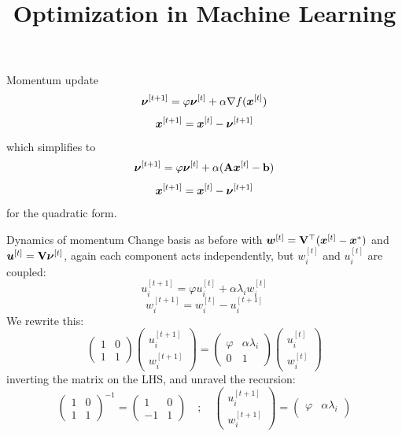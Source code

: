 \documentclass[11pt,compress,t,notes=noshow, xcolor=table]{beamer}
\title{Optimization in Machine Learning}
\begin{document}

\begin{framev}{Momentum update}
$$
\bm{\nu}^{[ t+1 ] } = \varphi \bm{\nu}^{[ t ] } + \alpha \nabla f(\bm{x}^{[ t ] })
$$
$$
\bm{x}^{[ t+1 ] } = \bm{x}^{[ t ] } - \bm{\nu}^{[ t+1 ] }
$$
which simplifies to
$$
\bm{\nu}^{[ t+1 ] } = \varphi \bm{\nu}^{[ t ] } + \alpha (\mathbf{A} \bm{x}^{[ t ] } - \mathbf{b})
$$
$$
\bm{x}^{[ t+1 ] } = \bm{x}^{[ t ] } - \bm{\nu}^{[ t+1 ] }
$$
for the quadratic form.
\end{framev}


\begin{framev}[fs=footnotesize]{Dynamics of momentum}
Change basis as before with $\wv^{[ t ] } = \V^\top (\xv^{[ t ] } - \xvs)$ and $\uv^{[ t ] } = \V \nuv^{[ t ] }$, again each component acts independently, but $w_i^{[ t ] }$ and $u_i^{[ t ] }$ are coupled:
$$
u_i^{[ t+1 ] } = \varphi u_i^{[ t ] } + \alpha \lambda_i w_i^{[ t ] }
$$
$$
w_i^{[ t+1 ] } = w_i^{[ t ] } - u_i^{[ t+1 ] }
$$
We rewrite this:
$$
\begin{pmatrix}
1 & 0 \\
1 & 1
\end{pmatrix}
\begin{pmatrix}
u_i^{[ t+1 ] } \\
w_i^{[ t+1 ] }
\end{pmatrix} =
\begin{pmatrix}
\varphi & \alpha \lambda_i \\
0 & 1
\end{pmatrix}
\begin{pmatrix}
u_i^{[ t ] } \\
w_i^{[ t ] }
\end{pmatrix}
$$
inverting the matrix on the LHS, and unravel the recursion:
$$
\begin{pmatrix}
1 & 0 \\
1 & 1
\end{pmatrix}^{-1} =
\begin{pmatrix}
1 & 0 \\
-1 & 1
\end{pmatrix}
\quad ; \quad
\begin{pmatrix}
u_i^{[ t+1 ] } \\
w_i^{[ t+1 ] }
\end{pmatrix} =
\begin{pmatrix}
\varphi & \alpha \lambda_i \\

\end{pmatrix}$$
\end{framev}
\end{document}
